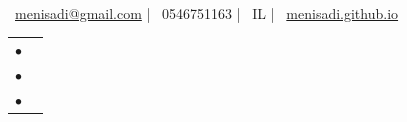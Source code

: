 \documentclass[]{awesome-cv}
\begin{document}
    
\begin{center}
	  \\
	\vspace{2mm}
	{\faEnvelope\ \href{mailto:menisadi@gmail.com}{menisadi@gmail.com}} | {\faMobile\ 0546751163} | {\faMapMarker\ IL} | {\faLink\ \href{https://menisadi.github.io/}{menisadi.github.io}}
\end{center}
\vspace{-5mm}
\begin{cventries}
	\cventry
	{}
	{\def\arraystretch{1.15}{\begin{tabular}{ l l }
		$\bullet$  & {\skill{\quad Data Scientist at Intent IQ with 2+ years applying ML and algorithms research in production AdTech systems.}} \\
		$\bullet$  & {\skill{\quad Ph.D. in Computer Science; thesis on machine learning and data privacy.}} \\
		$\bullet$  & {\skill{\quad Published at top-tier venues (ICML, NeurIPS, ESA, ALT).}} \\
		\end{tabular}}}
	{}
	{}
	{}
\end{cventries}

\vspace{-10mm}
\end{document}
